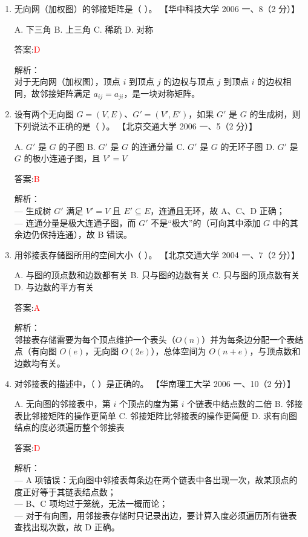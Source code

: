 \documentclass[lang=cn,newtx,10pt,scheme=chinese]{../../../elegantbook}
\begin{document}
\begin{enumerate}
    
    \item 无向网（加权图）的邻接矩阵是（ ）。  
    【华中科技大学 2006 一、8（2 分）】

    A. 下三角  
    B. 上三角  
    C. 稀疏  
    D. 对称

    答案:\textcolor{red}{D}

    解析：\\
    对于无向网（加权图），顶点 $i$ 到顶点 $j$ 的边权与顶点 $j$ 到顶点 $i$ 的边权相同，故邻接矩阵满足 $a_{ij}=a_{ji}$，是一块对称矩阵。\\

\item 设有两个无向图 $G=(V,E)$、$G'=(V',E')$，如果 $G'$ 是 $G$ 的生成树，则下列说法不正确的是（ ）。  
    【北京交通大学 2006 一、5（2 分）】

    A. $G'$ 是 $G$ 的子图  
    B. $G'$ 是 $G$ 的连通分量  
    C. $G'$ 是 $G$ 的无环子图  
    D. $G'$ 是 $G$ 的极小连通子图，且 $V'=V$

    答案:\textcolor{red}{B}

    解析：\\
    — 生成树 $G'$ 满足 $V'=V$ 且 $E'\subseteq E$，连通且无环，故 A、C、D 正确；\\
    — 连通分量是极大连通子图，而 $G'$ 不是“极大”的（可向其中添加 $G$ 中的其余边仍保持连通），故 B 错误。\\

\item 用邻接表存储图所用的空间大小（ ）。  
    【北京交通大学 2004 一、7（2 分）】

    A. 与图的顶点数和边数都有关  
    B. 只与图的边数有关  
    C. 只与图的顶点数有关  
    D. 与边数的平方有关

    答案:\textcolor{red}{A}

    解析：\\
    邻接表存储需要为每个顶点维护一个表头（$O(n)$）并为每条边分配一个表结点（有向图 $O(e)$，无向图 $O(2e)$），总体空间为 $O(n+e)$，与顶点数和边数均有关。\\

\item 对邻接表的描述中，（ ）是正确的。  
    【华南理工大学 2006 一、10（2 分）】

    A. 无向图的邻接表中，第 $i$ 个顶点的度为第 $i$ 个链表中结点数的二倍  
    B. 邻接表比邻接矩阵的操作更简单  
    C. 邻接矩阵比邻接表的操作更简便  
    D. 求有向图结点的度必须遍历整个邻接表

    答案:\textcolor{red}{D}

    解析：\\
    — A 项错误：无向图中邻接表每条边在两个链表中各出现一次，故某顶点的度正好等于其链表结点数；\\
    — B、C 项均过于笼统，无法一概而论；\\
    — 对于有向图，用邻接表存储时只记录出边，要计算入度必须遍历所有链表查找出现次数，故 D 正确。\\


\end{enumerate}
\end{document}
